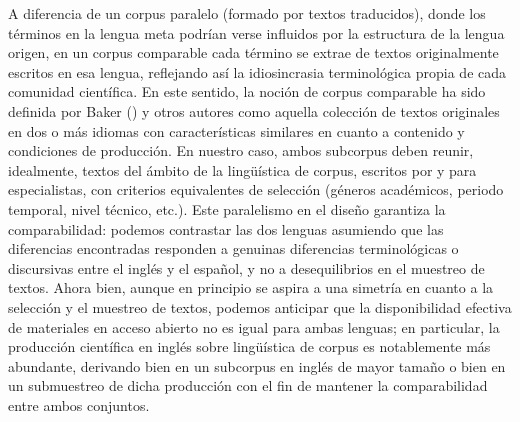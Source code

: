 A diferencia de un corpus paralelo (formado por textos traducidos), donde los términos en la lengua meta podrían verse influidos por la estructura de la lengua origen, en un corpus comparable cada término se extrae de textos originalmente escritos en esa lengua, reflejando así la idiosincrasia terminológica propia de cada comunidad científica. En este sentido, la noción de corpus comparable ha sido definida por Baker (\citeyear{baker1995corpora}) y otros autores como aquella colección de textos originales en dos o más idiomas con características similares en cuanto a contenido y condiciones de producción. En nuestro caso, ambos subcorpus deben reunir, idealmente, textos del ámbito de la lingüística de corpus, escritos por y para especialistas, con criterios equivalentes de selección (géneros académicos, periodo temporal, nivel técnico, etc.). Este paralelismo en el diseño garantiza la comparabilidad: podemos contrastar las dos lenguas asumiendo que las diferencias encontradas responden a genuinas diferencias terminológicas o discursivas entre el inglés y el español, y no a desequilibrios en el muestreo de textos. Ahora bien, aunque en principio se aspira a una simetría en cuanto a la selección y el muestreo de textos, podemos anticipar que la disponibilidad efectiva de materiales en acceso abierto no es igual para ambas lenguas; en particular, la producción científica en inglés sobre lingüística de corpus es notablemente más abundante, derivando bien en un subcorpus en inglés de mayor tamaño o bien en un submuestreo de dicha producción con el fin de mantener la comparabilidad entre ambos conjuntos.


